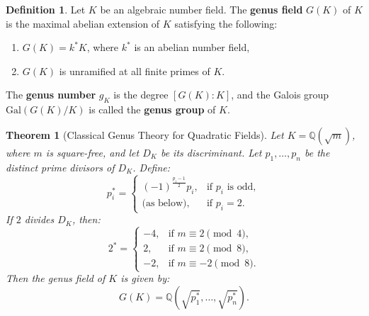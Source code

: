 \documentclass[12 pt]{amsart}
\newcommand\Gal{{\mathrm {Gal}}}
\newtheorem{theorem}[thm]{Theorem}
\theoremstyle{definition}
\newtheorem{definition}{Definition}
\theoremstyle{remark}
\begin{document}
\begin{definition}
Let $K$ be an algebraic number field. The \textbf{genus field} $G(K)$ of $K$ is the maximal abelian extension of $K$ satisfying the following:
\begin{enumerate}
\item $G(K) = k^*K$, where $k^*$ is an abelian number field,
\item $G(K)$ is unramified at all finite primes of $K$.
\end{enumerate}
The \textbf{genus number} $g_K$ is the degree $[G(K) : K]$, and the Galois group $\Gal(G(K)/K)$ is called the \textbf{genus group} of $K$.
\end{definition}

\begin{theorem}[Classical Genus Theory for Quadratic Fields] \label{genusnumber:quadratic}
Let $K = \mathbb{Q}(\sqrt{m})$, where $m$ is square-free, and let $D_K$ be its discriminant. Let $p_1, \dots, p_n$ be the distinct prime divisors of $D_K$. Define:
\[
p_i^* = 
\begin{cases}
(-1)^{\frac{p_i - 1}{2}} p_i, & \text{if } p_i \text{ is odd}, \\
\text{(as below)}, & \text{if } p_i = 2.
\end{cases}
\]
If $2$ divides $D_K$, then:
\[
2^* = 
\begin{cases}
-4, & \text{if } m \equiv 2 \pmod{4}, \\
2, & \text{if } m \equiv 2 \pmod{8}, \\
-2, & \text{if } m \equiv -2 \pmod{8}.
\end{cases}
\]
Then the genus field of $K$ is given by:
\[
G(K) = \mathbb{Q}\left( \sqrt{p_1^*}, \dots, \sqrt{p_n^*} \right).
\]
\end{theorem}
\end{document}
